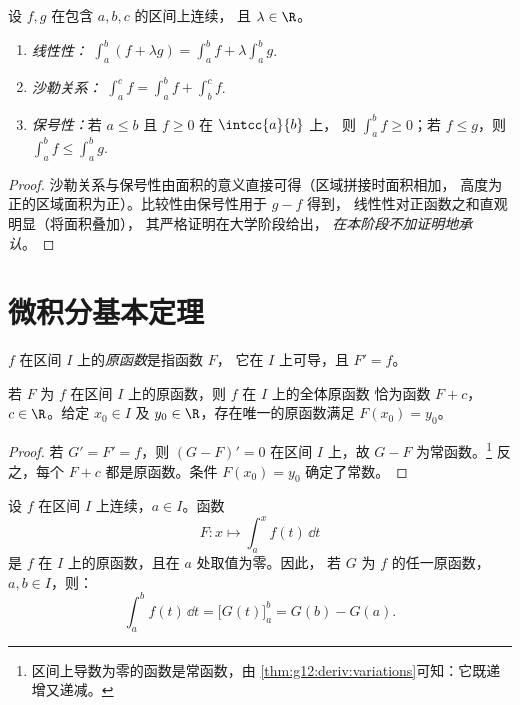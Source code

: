 \begin{proposition}[积分的性质]\label{prop:g12:integ:properties}
设 $f, g$ 在包含 $a, b, c$ 的区间上连续，
且 $\lambda \in \R$。
\begin{enumerate}
  \item \emph{线性性：}
        $\displaystyle\int_a^b (f + \lambda g) = \int_a^b f + \lambda \int_a^b g$.
  \item \emph{沙勒关系：}
        $\displaystyle\int_a^c f = \int_a^b f + \int_b^c f$.
  \item \emph{保号性：}若 $a \leq b$ 且 $f \geq 0$ 在 $\intcc{a}{b}$ 上，
        则 $\displaystyle\int_a^b f \geq 0$；若 $f \leq g$，则
        $\displaystyle\int_a^b f \leq \int_a^b g$.
\end{enumerate}
\end{proposition}

\begin{proof}
沙勒关系与保号性由面积的意义直接可得（区域拼接时面积相加，
高度为正的区域面积为正）。比较性由保号性用于 $g - f$ 得到，
线性性对正函数之和直观明显（将面积叠加），
其严格证明在大学阶段给出，
\emph{在本阶段不加证明地承认}。
\end{proof}

\section{微积分基本定理}

\begin{definition}[原函数]\label{def:g12:integ:primitive}
$f$ 在区间 $I$ 上的\emph{原函数}是指函数 $F$，
它在 $I$ 上可导，且 $F' = f$。
\end{definition}

\begin{proposition}\label{prop:g12:integ:primunique}
若 $F$ 为 $f$ 在区间 $I$ 上的原函数，则 $f$ 在 $I$ 上的全体原函数
恰为函数 $F + c$，$c \in \R$。给定 $x_0 \in I$ 及
$y_0 \in \R$，存在唯一的原函数满足 $F(x_0) = y_0$。
\end{proposition}

\begin{proof}
若 $G' = F' = f$，则 $(G - F)' = 0$ 在区间 $I$ 上，故 $G - F$
为常函数。\footnote{区间上导数为零的函数是常函数，由
\cref{thm:g12:deriv:variations}可知：它既递增又递减。}
反之，每个 $F + c$ 都是原函数。条件
$F(x_0) = y_0$ 确定了常数。
\end{proof}

\begin{theorem}[微积分基本定理]\label{thm:g12:integ:ftc}
设 $f$ 在区间 $I$ 上连续，$a \in I$。函数
\[
F \colon x \longmapsto \int_a^x f(t)\,\dd t
\]
是 $f$ 在 $I$ 上的原函数，且在 $a$ 处取值为零。因此，
若 $G$ 为 $f$ 的任一原函数，$a, b \in I$，则：
\[
\int_a^b f(t)\,\dd t = \bigl[G(t)\bigr]_a^b = G(b) - G(a).
\]
\end{theorem}

